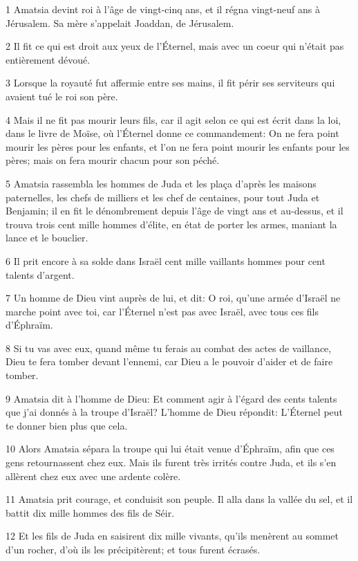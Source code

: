 \par 1 Amatsia devint roi à l'âge de vingt-cinq ans, et il régna vingt-neuf ans à Jérusalem. Sa mère s'appelait Joaddan, de Jérusalem.
\par 2 Il fit ce qui est droit aux yeux de l'Éternel, mais avec un coeur qui n'était pas entièrement dévoué.
\par 3 Lorsque la royauté fut affermie entre ses mains, il fit périr ses serviteurs qui avaient tué le roi son père.
\par 4 Mais il ne fit pas mourir leurs fils, car il agit selon ce qui est écrit dans la loi, dans le livre de Moïse, où l'Éternel donne ce commandement: On ne fera point mourir les pères pour les enfants, et l'on ne fera point mourir les enfants pour les pères; mais on fera mourir chacun pour son péché.
\par 5 Amatsia rassembla les hommes de Juda et les plaça d'après les maisons paternelles, les chefs de milliers et les chef de centaines, pour tout Juda et Benjamin; il en fit le dénombrement depuis l'âge de vingt ans et au-dessus, et il trouva trois cent mille hommes d'élite, en état de porter les armes, maniant la lance et le bouclier.
\par 6 Il prit encore à sa solde dans Israël cent mille vaillants hommes pour cent talents d'argent.
\par 7 Un homme de Dieu vint auprès de lui, et dit: O roi, qu'une armée d'Israël ne marche point avec toi, car l'Éternel n'est pas avec Israël, avec tous ces fils d'Éphraïm.
\par 8 Si tu vas avec eux, quand même tu ferais au combat des actes de vaillance, Dieu te fera tomber devant l'ennemi, car Dieu a le pouvoir d'aider et de faire tomber.
\par 9 Amatsia dit à l'homme de Dieu: Et comment agir à l'égard des cents talents que j'ai donnés à la troupe d'Israël? L'homme de Dieu répondit: L'Éternel peut te donner bien plus que cela.
\par 10 Alors Amatsia sépara la troupe qui lui était venue d'Éphraïm, afin que ces gens retournassent chez eux. Mais ils furent très irrités contre Juda, et ils s'en allèrent chez eux avec une ardente colère.
\par 11 Amatsia prit courage, et conduisit son peuple. Il alla dans la vallée du sel, et il battit dix mille hommes des fils de Séir.
\par 12 Et les fils de Juda en saisirent dix mille vivants, qu'ils menèrent au sommet d'un rocher, d'où ils les précipitèrent; et tous furent écrasés.
